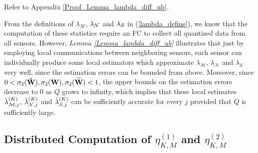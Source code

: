 \documentclass[11pt, draftclsnofoot, onecolumn]{IEEEtran}
\newcommand{\cM}{\mathcal{M}}
\newcommand{\cN}{\mathcal{N}}
\newcommand{\cS}{\mathcal{S}}
\newcommand{\cW}{{\check{W}}}
\newcommand{\tW}{{\widetilde{W}}}
\begin{document}
\begin{IEEEproof}
	Refer to Appendix \ref{Proof_Lemma_lambda_diff_ub}.
\end{IEEEproof}


From the definitions of ${\lambda _\cM}$, ${\lambda _{\cal N}}$ and ${\lambda _{\cal S}}$ in (\ref{lambda_define}), we know that the computation of these statistics require an FC to collect all quantized data from all sensors.  However, \emph{Lemma \ref{Lemma_lambda_diff_ub}} illustrates that 
just by employing local communications between neighboring sensors,  each sensor can individually produce some local estimators 
which approximate ${\lambda _{\cM}}$, ${\lambda _{\cN}}$ and ${\lambda _{\cS}}$ very well, since the estimation errors can be bounded from above. Moreover, since $0< {{\sigma _2}( {\bf{\cW}} )}, {{\sigma _2}( {\bf{W}} )}, {{\sigma _2}( {\bf{\tW}} )}<1$, the upper bounds on the estimation errors decrease to $0$ as $Q$ grows to infinity, which implies that these local estimates $\hat \lambda _{{\cal M},j}^{(K)}$, $\hat \lambda _{{\cal N},j}^{(K)}$ and $\hat \lambda _{{\cal S},j}^{(K)}$  can be sufficiently accurate for every $j$ provided that $Q$ is sufficiently large. 

\subsection{Distributed Computation of ${\eta} _{K,M}^{(1)}$ and ${\eta}  _{K,M}^{(2)}$}
\end{document}
